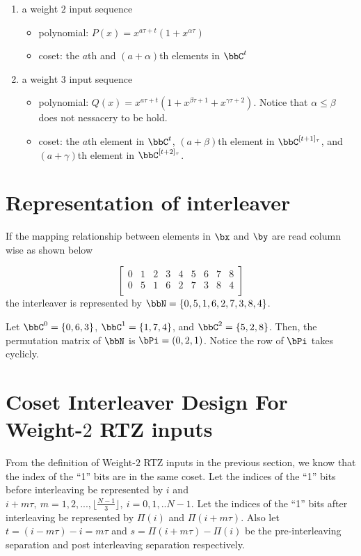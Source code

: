 \documentclass[11pt, oneside, dvipdfmx]{book}
\begin{document}
\begin{enumerate}
\item a weight $2$ input sequence
\begin{itemize}
	\item polynomial: $P(x)=x^{a\tau+t}(1+x^{\alpha \tau})$
	\item coset: the $a$th and $(a+\alpha)$th elements in $\bbC^t$
\end{itemize}
\item a weight $3$ input sequence
\begin{itemize}
	\item polynomial: $Q(x) =x^{a\tau+t}(1+x^{\beta \tau +1}+x^{\gamma \tau +2})$. Notice that $\alpha \leq \beta$ does not nessacery to be hold.
	\item coset: the $a$th element in $\bbC^{t}$, $(a+\beta)$th element in $\bbC^{[t+1]_\tau}$, and $(a+\gamma)$th element in $\bbC^{[t+2]_\tau}$.
\end{itemize}
\end{enumerate}

\section{Representation of interleaver}
If the mapping relationship between elements in $\bx$ and $\by$ are read column wise as shown below

$$  
 \begin{bmatrix}
0 & 1 & 2 & 3 & 4 & 5 & 6 & 7 & 8 \\
0 & 5 & 1 & 6 & 2 & 7 & 3 & 8 & 4 \\
\end{bmatrix}
$$
the interleaver is represented by $\bbN=\{0,5,1,6,2,7,3,8,4\}$.

Let $\bbC^0=\{0,6,3\}$, $\bbC^1=\{1,7,4\}$, and $\bbC^2=\{5,2,8\}$. Then, the permutation matrix of $\bbN$ is
$\bPi = (0,2,1)$. Notice the row of $\bPi$ takes cyclicly.


\section{Coset Interleaver Design For Weight-$2$ RTZ inputs}
From the definition of Weight-$2$ RTZ inputs in the previous section, we know that the index of the ``1'' bits are in the same coset. Let the indices of the ``1'' bits before interleaving be represented by $i$ and $i+m\tau ,~m=1,2,...,\lfloor \frac{N-1}{3} \rfloor,~i=0,1,..N-1$. Let the indices of the ``1'' bits after interleaving be represented by $\Pi(i)$ and $\Pi(i+m\tau)$. Also let $t=(i-m\tau) -i=m\tau$ and $s = \Pi(i+m\tau) - \Pi(i)$ be the pre-interleaving separation and post interleaving separation respectively.
\end{document}
